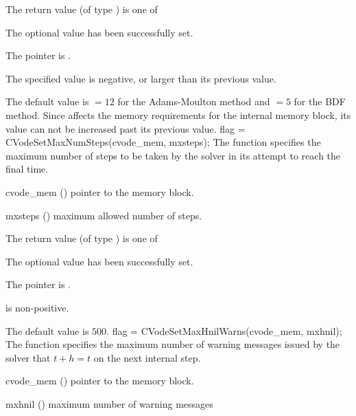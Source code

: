 {
  The return value  (of type ) is one of
  \begin{args}
  \item[\Id{CV\_SUCCESS}] 
    The optional value has been successfully set.
  \item[\Id{CV\_MEM\_NULL}]
    The  pointer is .
  \item[\Id{CV\_ILL\_INPUT}]
    The specified value  is negative, or larger than 
    its previous value.
  \end{args}
}
{
  The default value is $= 12$ for
  the Adams-Moulton method and $= 5$
  for the BDF method.
  Since  affects the memory requirements
  for the internal {\cvode} memory block, its value
  can not be increased past its previous value.
}
{
flag = CVodeSetMaxNumSteps(cvode\_mem, mxsteps);
}
{
  The function  specifies the maximum number
  of steps to be taken by the solver in its attempt to reach 
  the final time.
}
{
  \begin{args}
  \item[cvode\_mem] ()
    pointer to the {\cvode} memory block.
  \item[mxsteps] ()
    maximum allowed number of steps.
  \end{args}
}
{
  The return value  (of type ) is one of
  \begin{args}
  \item[\Id{CV\_SUCCESS}] 
    The optional value has been successfully set.
  \item[\Id{CV\_MEM\_NULL}]
    The  pointer is .
  \item[\Id{CV\_ILL\_INPUT}]
     is non-positive.
  \end{args}
}
{
  The default value is $500$.
}
{
flag = CVodeSetMaxHnilWarns(cvode\_mem, mxhnil);
}
{
  The function  specifies the maximum number of warning
  messages issued by the solver that $t+h=t$ on the next internal step.
}
{
  \begin{args}
  \item[cvode\_mem] ()
    pointer to the {\cvode} memory block.
  \item[mxhnil] ()
    maximum number of warning messages
  \end{args}
}

